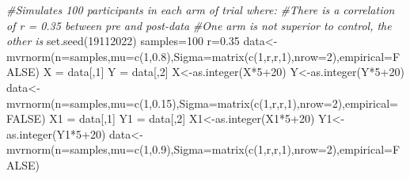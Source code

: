 \documentclass[
]{book}
\newenvironment{Shaded}{\begin{snugshade}}{\end{snugshade}}
\newcommand{\AttributeTok}[1]{\textcolor[rgb]{0.77,0.63,0.00}{#1}}
\newcommand{\CommentTok}[1]{\textcolor[rgb]{0.56,0.35,0.01}{\textit{#1}}}
\newcommand{\ConstantTok}[1]{\textcolor[rgb]{0.00,0.00,0.00}{#1}}
\newcommand{\DecValTok}[1]{\textcolor[rgb]{0.00,0.00,0.81}{#1}}
\newcommand{\FloatTok}[1]{\textcolor[rgb]{0.00,0.00,0.81}{#1}}
\newcommand{\FunctionTok}[1]{\textcolor[rgb]{0.00,0.00,0.00}{#1}}
\newcommand{\NormalTok}[1]{#1}
\newcommand{\OtherTok}[1]{\textcolor[rgb]{0.56,0.35,0.01}{#1}}
\newcommand{\SpecialCharTok}[1]{\textcolor[rgb]{0.00,0.00,0.00}{#1}}
\begin{document}
\begin{Shaded}
\begin{Highlighting}[]
\CommentTok{\#Simulates 100 participants in each arm of trial where:}
\CommentTok{\#There is a correlation of r = 0.35 between pre and post{-}data}
\CommentTok{\#One arm is not superior to control, the other is}
\FunctionTok{set.seed}\NormalTok{(}\DecValTok{19112022}\NormalTok{)}
\NormalTok{samples}\OtherTok{=}\DecValTok{100}
\NormalTok{r}\OtherTok{=}\FloatTok{0.35}
\NormalTok{data}\OtherTok{\textless{}{-}}\FunctionTok{mvrnorm}\NormalTok{(}\AttributeTok{n=}\NormalTok{samples,}\AttributeTok{mu=}\FunctionTok{c}\NormalTok{(}\DecValTok{1}\NormalTok{,}\FloatTok{0.8}\NormalTok{),}\AttributeTok{Sigma=}\FunctionTok{matrix}\NormalTok{(}\FunctionTok{c}\NormalTok{(}\DecValTok{1}\NormalTok{,r,r,}\DecValTok{1}\NormalTok{),}\AttributeTok{nrow=}\DecValTok{2}\NormalTok{),}\AttributeTok{empirical=}\ConstantTok{FALSE}\NormalTok{)}
\NormalTok{X }\OtherTok{=}\NormalTok{ data[,}\DecValTok{1}\NormalTok{]}
\NormalTok{Y }\OtherTok{=}\NormalTok{ data[,}\DecValTok{2}\NormalTok{]}
\NormalTok{X}\OtherTok{\textless{}{-}}\FunctionTok{as.integer}\NormalTok{(X}\SpecialCharTok{*}\DecValTok{5}\SpecialCharTok{+}\DecValTok{20}\NormalTok{)}
\NormalTok{Y}\OtherTok{\textless{}{-}}\FunctionTok{as.integer}\NormalTok{(Y}\SpecialCharTok{*}\DecValTok{5}\SpecialCharTok{+}\DecValTok{20}\NormalTok{)}
\NormalTok{data}\OtherTok{\textless{}{-}}\FunctionTok{mvrnorm}\NormalTok{(}\AttributeTok{n=}\NormalTok{samples,}\AttributeTok{mu=}\FunctionTok{c}\NormalTok{(}\DecValTok{1}\NormalTok{,}\FloatTok{0.15}\NormalTok{),}\AttributeTok{Sigma=}\FunctionTok{matrix}\NormalTok{(}\FunctionTok{c}\NormalTok{(}\DecValTok{1}\NormalTok{,r,r,}\DecValTok{1}\NormalTok{),}\AttributeTok{nrow=}\DecValTok{2}\NormalTok{),}\AttributeTok{empirical=}\ConstantTok{FALSE}\NormalTok{)}
\NormalTok{X1 }\OtherTok{=}\NormalTok{ data[,}\DecValTok{1}\NormalTok{]}
\NormalTok{Y1 }\OtherTok{=}\NormalTok{ data[,}\DecValTok{2}\NormalTok{]}
\NormalTok{X1}\OtherTok{\textless{}{-}}\FunctionTok{as.integer}\NormalTok{(X1}\SpecialCharTok{*}\DecValTok{5}\SpecialCharTok{+}\DecValTok{20}\NormalTok{)}
\NormalTok{Y1}\OtherTok{\textless{}{-}}\FunctionTok{as.integer}\NormalTok{(Y1}\SpecialCharTok{*}\DecValTok{5}\SpecialCharTok{+}\DecValTok{20}\NormalTok{)}
\NormalTok{data}\OtherTok{\textless{}{-}}\FunctionTok{mvrnorm}\NormalTok{(}\AttributeTok{n=}\NormalTok{samples,}\AttributeTok{mu=}\FunctionTok{c}\NormalTok{(}\DecValTok{1}\NormalTok{,}\FloatTok{0.9}\NormalTok{),}\AttributeTok{Sigma=}\FunctionTok{matrix}\NormalTok{(}\FunctionTok{c}\NormalTok{(}\DecValTok{1}\NormalTok{,r,r,}\DecValTok{1}\NormalTok{),}\AttributeTok{nrow=}\DecValTok{2}\NormalTok{),}\AttributeTok{empirical=}\ConstantTok{FALSE}\NormalTok{)}

\end{Highlighting}
\end{Shaded}
\end{document}
